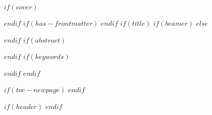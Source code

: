 $if(cover)$

$endif$
$if(has-frontmatter)$
\frontmatter
$endif$
$if(title)$
$if(beamer)$
\frame{\titlepage}
$else$
\maketitle
$endif$
$if(abstract)$
\begin{abstract}
$abstract$
\end{abstract}
$endif$
$if(keywords)$
\begin{center}
\end{center}
$endif$
$endif$

$if(toc-newpage)$
\newpage
$endif$

$if(header)$
$endif$